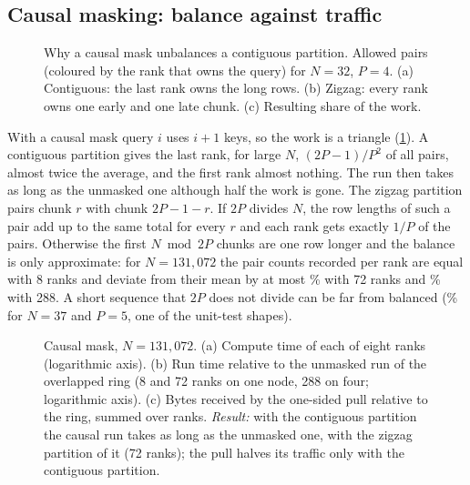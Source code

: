 \subsection{Causal masking: balance against traffic}\label{sec:causal}
\begin{figure}[t]
\centering
{}
\caption{Why a causal mask unbalances a contiguous partition. Allowed pairs
(coloured by the rank that owns the query) for $N=32$, $P=4$. (a) Contiguous: the
last rank owns the long rows. (b) Zigzag: every rank owns one early and one late
chunk. (c) Resulting share of the work.}
\label{fig:causalconcept}
\end{figure}

With a causal mask query $i$ uses $i+1$ keys, so the work is a triangle
(\cref{fig:causalconcept}). A contiguous partition gives the last rank, for large
$N$, $(2P-1)/P^2$ of all pairs, almost twice the average, and the first rank almost
nothing. The run then takes as long as the unmasked one although half the work is
gone. The zigzag partition pairs chunk $r$ with chunk $2P-1-r$. If $2P$ divides
$N$, the row lengths of such a pair add up to the same total for every $r$ and
each rank gets exactly $1/P$ of the pairs. Otherwise the first $N \bmod 2P$ chunks
are one row longer and the balance is only approximate: for $N=131{,}072$ the pair
counts recorded per rank are equal with 8 ranks and deviate from their mean by at
most \% with 72 ranks and
\% with 288. A short sequence that $2P$ does
not divide can be far from balanced (\%
for $N=37$ and $P=5$, one of the unit-test shapes).

\begin{figure}[t]
\centering
{}
\caption{Causal mask, $N=131{,}072$. (a) Compute time of each of eight ranks
(logarithmic axis). (b) Run time relative to the unmasked run of the overlapped
ring (8 and 72 ranks on one node, 288 on four; logarithmic axis). (c) Bytes
received by the one-sided pull relative to the ring, summed over ranks.
\emph{Result:} with the contiguous partition the causal run takes as long as the
unmasked one, with the zigzag partition  of it
(72 ranks); the pull halves its traffic only with the contiguous partition.}
\label{fig:causal}
\end{figure}

